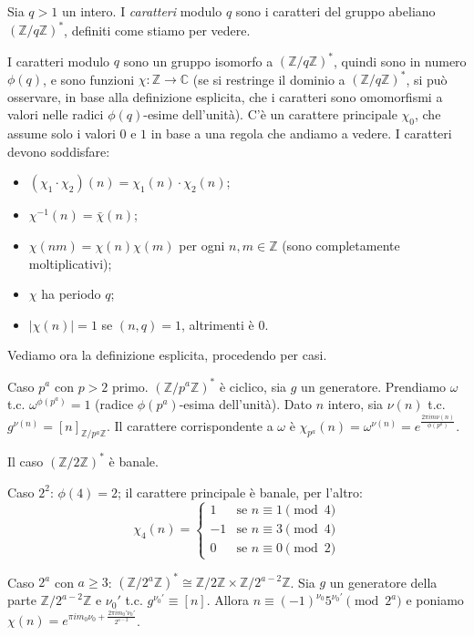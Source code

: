 \begin{defn}
  Sia $q>1$ un intero. I \textit{caratteri} modulo $q$ sono i caratteri del gruppo abeliano $(\mathbb{Z}/q \mathbb{Z})^*$, definiti come stiamo per vedere.
\end{defn}

I caratteri modulo $q$ sono un gruppo isomorfo a $(\mathbb{Z}/q \mathbb{Z})^*$, quindi sono in numero $\phi(q)$, e sono funzioni $\chi:\mathbb{Z} \longrightarrow \mathbb{C}$ (se si restringe il dominio a $(\mathbb{Z}/q \mathbb{Z})^*$, si può osservare, in base alla definizione esplicita, che i caratteri sono omomorfismi a valori nelle radici $\phi(q)$-esime dell'unità). C'è un carattere principale $\chi_0$, che assume solo i valori $0$ e $1$ in base a una regola che andiamo a vedere. I caratteri devono soddisfare:
\begin{itemize}
  \item $(\chi_1\cdot\chi_2)(n)=\chi_1(n)\cdot\chi_2(n)$;
  \item $\chi^{-1}(n)=\bar{\chi}(n)$;
  \item $\chi(nm)=\chi(n)\chi(m)$ per ogni $n,m \in \mathbb{Z}$ (sono completamente moltiplicativi);
  \item $\chi$ ha periodo $q$;
  \item $|\chi(n)|=1$ se $(n,q)=1$, altrimenti è $0$.
\end{itemize}

Vediamo ora la definizione esplicita, procedendo per casi.

Caso $p^a$ con $p>2$ primo. $(\mathbb{Z}/p^a \mathbb{Z})^*$ è ciclico, sia $g$ un generatore. Prendiamo $\omega$ t.c. $\omega^{\phi(p^a)}=1$ (radice $\phi(p^a)$-esima dell'unità). Dato $n$ intero, sia $\nu(n)$ t.c. $g^{\nu(n)}=[n]_{\mathbb{Z}/p^a \mathbb{Z}}$.
Il carattere corrispondente a $\omega$ è $\chi_{p^a}(n)=\omega^{\nu(n)}=e^{\frac{2\pi im\nu(n)}{\phi(p^a)}}$.

Il caso $(\mathbb{Z}/2 \mathbb{Z})^*$ è banale.

Caso $2^2$: $\phi(4)=2$; il carattere principale è banale, per l'altro:
$$\chi_4(n)=\begin{cases}
  1 &\mbox{se } n \equiv 1 \pmod{4} \\
  -1 &\mbox{se } n \equiv 3 \pmod{4} \\
  0 &\mbox{se } n \equiv 0 \pmod{2}
\end{cases}$$

Caso $2^a$ con $a \ge 3$: $(\mathbb{Z}/2^a \mathbb{Z})^* \cong \mathbb{Z}/2 \mathbb{Z} \times \mathbb{Z}/2^{a-2} \mathbb{Z}$.
Sia $g$ un generatore della parte $\mathbb{Z}/2^{a-2} \mathbb{Z}$ e $\nu_0'$ t.c. $g^{\nu_0'} \equiv [n]$. Allora $n \equiv (-1)^{\nu_0}5^{\nu_0'} \pmod{2^a}$ e poniamo $\chi(n)=e^{\pi im_0\nu_0+\frac{2\pi im_0'\nu_0'}{2^{a-2}}}$.

